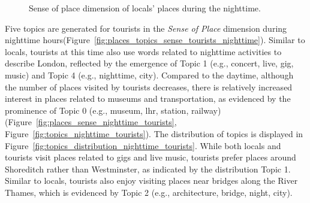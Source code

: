 \documentclass{article}
\theoremstyle{remark}
\begin{document}
\begin{figure}[!h]
    \caption{Sense of place dimension of locals' places during the nighttime.}
    \label{fig:places_topics_sense_locals_nighttime}
\end{figure}

Five topics are generated for tourists in the \textit{Sense of Place} dimension during nighttime hours(Figure~\ref{fig:places_topics_sense_tourists_nighttime}). Similar to locals, tourists at this time also use words related to nighttime activities to describe London, reflected by the emergence of Topic 1 (e.g., concert, live, gig, music) and Topic 4 (e.g., nighttime, city). Compared to the daytime, although the number of places visited by tourists decreases, there is relatively increased interest in places related to museums and transportation, as evidenced by the prominence of Topic 0 (e.g., museum, lhr, station, railway) (Figure~\ref{fig:places_sense_nighttime_tourists}, Figure~\ref{fig:topics_nighttime_tourists}). The distribution of topics is displayed in Figure~\ref{fig:topics_distribution_nighttime_tourists}. While both locals and tourists visit places related to gigs and live music, tourists prefer places around Shoreditch rather than Westminster, as indicated by the distribution Topic 1. Similar to locals, tourists also enjoy visiting places near bridges along the River Thames, which is evidenced by Topic 2 (e.g., architecture, bridge, night, city).
\end{document}
